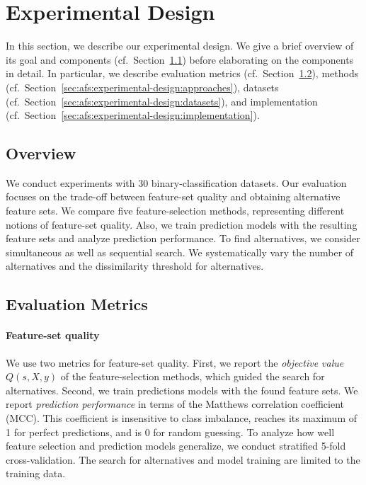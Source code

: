 \documentclass{article}
\theoremstyle{definition}
\begin{document}
\section{Experimental Design}
\label{sec:afs:experimental-design}

In this section, we describe our experimental design.
We give a brief overview of its goal and components (cf.~Section~\ref{sec:afs:experimental-design:overview}) before elaborating on the components in detail.
In particular, we describe evaluation metrics (cf.~Section~\ref{sec:afs:experimental-design:evaluation}), methods (cf.~Section~\ref{sec:afs:experimental-design:approaches}), datasets (cf.~Section~\ref{sec:afs:experimental-design:datasets}), and implementation (cf.~Section~\ref{sec:afs:experimental-design:implementation}).

\subsection{Overview}
\label{sec:afs:experimental-design:overview}

We conduct experiments with 30 binary-classification datasets.
Our evaluation focuses on the trade-off between feature-set quality and obtaining alternative feature sets.
We compare five feature-selection methods, representing different notions of feature-set quality.
Also, we train prediction models with the resulting feature sets and analyze prediction performance.
To find alternatives, we consider simultaneous as well as sequential search.
We systematically vary the number of alternatives and the dissimilarity threshold for alternatives.

\subsection{Evaluation Metrics}
\label{sec:afs:experimental-design:evaluation}

\paragraph{Feature-set quality}

We use two metrics for feature-set quality.
First, we report the \emph{objective value}~$Q(s,X,y)$ of the feature-selection methods, which guided the search for alternatives.
Second, we train predictions models with the found feature sets.
We report \emph{prediction performance} in terms of the Matthews correlation coefficient (MCC).
This coefficient is insensitive to class imbalance, reaches its maximum of 1 for perfect predictions, and is 0 for random guessing.
To analyze how well feature selection and prediction models generalize, we conduct stratified 5-fold cross-validation.
The search for alternatives and model training are limited to the training data.
\end{document}
